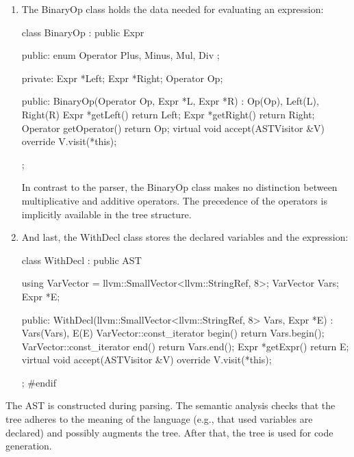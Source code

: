 \begin{enumerate}
\item
The BinaryOp class holds the data needed for evaluating an expression:

\begin{cpp}
class BinaryOp : public Expr {
public:
    enum Operator { Plus, Minus, Mul, Div };

private:
    Expr *Left;
    Expr *Right;
    Operator Op;

public:
    BinaryOp(Operator Op, Expr *L, Expr *R)
        : Op(Op), Left(L), Right(R) {}
    Expr *getLeft() { return Left; }
    Expr *getRight() { return Right; }
    Operator getOperator() { return Op; }
    virtual void accept(ASTVisitor &V) override {
        V.visit(*this);
    }
};
\end{cpp}

In contrast to the parser, the BinaryOp class makes no distinction between multiplicative and additive operators. The precedence of the operators is implicitly available in the tree structure.

\item
And last, the WithDecl class stores the declared variables and the expression:

\begin{cpp}
class WithDecl : public AST {
    using VarVector =
        llvm::SmallVector<llvm::StringRef, 8>;
    VarVector Vars;
    Expr *E;

public:
    WithDecl(llvm::SmallVector<llvm::StringRef, 8> Vars,
            Expr *E)
        : Vars(Vars), E(E) {}
    VarVector::const_iterator begin()
                                { return Vars.begin(); }
    VarVector::const_iterator end() { return Vars.end(); }
    Expr *getExpr() { return E; }
    virtual void accept(ASTVisitor &V) override {
        V.visit(*this);
    }
};
#endif
\end{cpp}

\end{enumerate}

The AST is constructed during parsing. The semantic analysis checks that the tree adheres to the meaning of the language (e.g., that used variables are declared) and possibly augments the tree. After that, the tree is used for code generation.